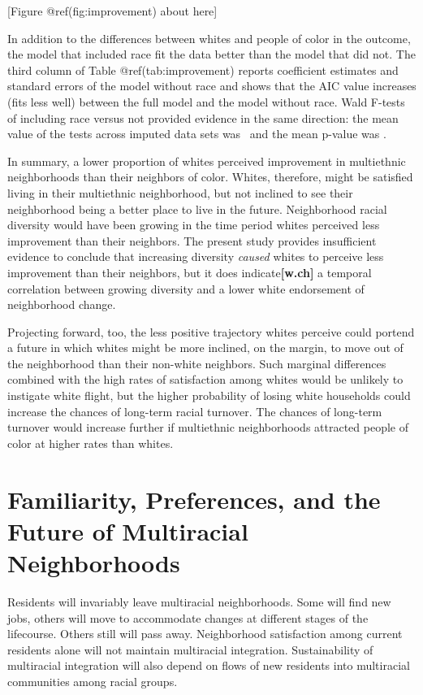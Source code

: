 \documentclass{baderart}
\begin{document}
{[}Figure @ref(fig:improvement) about here{]}

In addition to the differences between whites and people of color in the outcome, the model that included race fit the data better than the model that did not. The third column of Table @ref(tab:improvement) reports coefficient estimates and standard errors of the model without race and shows that the AIC value increases (fits less well) between the full model and the model without race. Wald F-tests of including race versus not provided evidence in the same direction: the mean value of the tests across imputed data sets was \betWaldF~and the mean p-value was \betWaldp.

In summary, a lower proportion of whites perceived improvement in multiethnic neighborhoods than their neighbors of color. Whites, therefore, might be satisfied living in their multiethnic neighborhood, but not inclined to see their neighborhood being a better place to live in the future. Neighborhood racial diversity would have been growing in the time period whites perceived less improvement than their neighbors. The present study provides insufficient evidence to conclude that increasing diversity \emph{caused} whites to perceive less improvement than their neighbors, but it does indicate\textbf{{[}w.ch{]}} a temporal correlation between growing diversity and a lower white endorsement of neighborhood change.

Projecting forward, too, the less positive trajectory whites perceive could portend a future in which whites might be more inclined, on the margin, to move out of the neighborhood than their non-white neighbors. Such marginal differences combined with the high rates of satisfaction among whites would be unlikely to instigate white flight, but the higher probability of losing white households could increase the chances of long-term racial turnover. The chances of long-term turnover would increase further if multiethnic neighborhoods attracted people of color at higher rates than whites.

\section{Familiarity, Preferences, and the Future of Multiracial Neighborhoods}
Residents will invariably leave multiracial neighborhoods. Some will find new jobs, others will move to accommodate changes at different stages of the lifecourse. Others still will pass away. Neighborhood satisfaction among current residents alone will not maintain multiracial integration. Sustainability of multiracial integration will also depend on flows of new residents into multiracial communities among racial groups.
\end{document}
